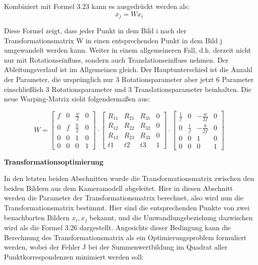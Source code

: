 Kombiniert mit Formel 3.23 kann es ausgedrückt werden als:
\begin{equation}
   x_j = Wx_i
\end{equation}

Diese Formel zeigt, dass jeder Punkt in dem Bild i nach der Transformationsmatrix W in einen entsprechenden Punkt in dem Bild j umgewandelt werden kann. Weiter in einem allgemeineren Fall, d.h. derzeit nicht nur mit Rotationseinfluss, sondern auch Translationseinfluss nehmen. Der Ableitungsverlauf ist im Allgemeinen gleich. Der Hauptunterschied ist die Anzahl der Parameter, die ursprünglich nur 3 Rotationsparameter aber jetzt 6 Parameter einschließlich 3 Rotationsparameter und 3 Translationsparameter beinhalten. Die neue Warping-Matrix sieht folgendermaßen aus:

\begin{equation}
   W = \begin{bmatrix}
	f			& 0 		& \frac{w}{2}	  & 0 \\
	0	 		& f			& \frac{h}{2} 	  & 0 \\
	0     		& 0 		& 1 			  & 0 \\	
	0     		& 0 		& 0 			  & 1
	\end{bmatrix} \cdot \begin{bmatrix}
	R_{11}			& R_{21}  		& R_{31}	  & 0 \\
	R_{12}	 		& R_{22}		& R_{32}	  & 0 \\
	R_{13}     		& R_{23} 		& R_{33} 	  & 0 \\	
	t1     			& t2 			& t3 		  & 1
	\end{bmatrix} \cdot \begin{bmatrix}
	\frac{1}{f}	   & 0 				& -\frac{w}{2f}	  & 0 \\
	0	 		   & \frac{1}{f}	& -\frac{h}{2f}   & 0 \\
	0     		   & 0 		        & 1 			  & 0 \\	
	0     		   & 0 		        & 0 			  & 1
	\end{bmatrix}
\end{equation}

\textbf{Transformationsoptimierung}

In den letzten beiden Abschnitten wurde die Transformationsmatrix zwischen den beiden Bildern aus dem Kameramodell abgeleitet. Hier in diesen Abschnitt werden die Parameter der Transformationsmatrix berechnet, also wird nun die Transformationsmatrix bestimmt. Hier sind die entsprechenden Punkte von zwei benachbarten Bildern $x_i, x_j$ bekannt, und die Umwandlungsbeziehung dazwischen wird als die Formel 3.26 dargestellt. Angesichts dieser Bedingung 
kann die Berechnung des Transformationsmatrix als ein Optimierungsproblem formuliert werden, wobei der Fehler J bei der Summenwertbildung im Quadrat aller Punktkorrespondenzen minimiert werden soll:

